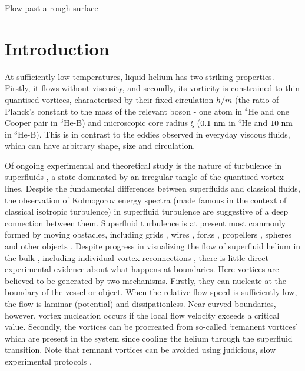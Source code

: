 \begin{chapter}{\label{cha:afm}Flow past a rough surface}
\section{Introduction}
At sufficiently low temperatures, liquid helium has two striking
properties.  Firstly, it flows without viscosity, and secondly,
its vorticity is constrained to
thin quantised vortices, characterised by their fixed circulation
$h/m$ (the ratio of Planck's constant to
the mass of the relevant boson - one atom in $^4$He and one Cooper pair 
in $^3$He-B) and microscopic core radius $\xi$ 
($0.1~\rm nm$ in $^4$He and $10~\rm nm$ in $^3$He-B).  
This is in contrast to the eddies observed in everyday viscous fluids, which can have arbitrary shape, size and circulation.  

Of ongoing experimental and theoretical study is the nature of 
turbulence in superfluids 
\cite{Barenghi2014,Bradley11,PhysRevLett.115.155303,PhysRevLett.110.014502}, a state 
dominated by an irregular tangle of the quantised vortex lines.  Despite the fundamental differences between superfluids and classical fluids, the observation of Kolmogorov energy spectra (made famous in the context of classical isotropic turbulence) in superfluid turbulence \cite{Barenghi2014} are suggestive of a deep connection between them.  Superfluid turbulence is at present most commonly formed by moving obstacles, including grids \cite{Davis2000,brad05}, wires \cite{Guenault1986,Bradley2011,Fisher2001}, forks \cite{Blaauwgeers2007,Bradley2012}, propellers \cite{Tabeling1998,Salort}, spheres \cite{Schoepe1995} and other objects \cite{VinenSkrbek2008}.
Despite progress in visualizing the flow of superfluid helium in the
bulk \cite{PhysRevLett.115.155303,PhysRevB.92.064519}, including individual vortex reconnections
\cite{Bewley09}, there is little direct experimental evidence
about what happens at boundaries.
Here vortices are believed to be generated by two mechanisms.  Firstly, 
they can nucleate at the boundary of the vessel or object.  
When the relative flow speed is sufficiently low, the flow is laminar 
{(potential)} and dissipationless.  
{Near curved boundaries, however, vortex nucleation occurs if
the local flow velocity exceeds a critical value.} 
Secondly, the vortices can be procreated from so-called `remanent vortices' 
which are present in the system since cooling the helium through the superfluid transition.  Note that remnant vortices can be avoided using judicious, slow experimental protocols \cite{PhysRevB.76.020504}. 


\end{chapter}
